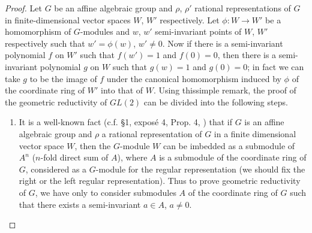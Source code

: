 \begin{proof}
Let $G$ be an affine algebraic group and $\rho$, $\rho'$ rational representations of $G$ in finite-dimensional vector spaces $W$, $W'$ respectively. Let $\phi:W\to W'$ be a homomorphism of $G$-modules and $w$, $w'$ semi-invariant points of $W$, $W'$ respectively such that $w'=\phi(w)$, $w'\neq 0$. Now if there is a semi-invariant polynomial $f$ on $W'$ such that $f(w')=1$ and $f(0)=0$, then there is a semi-invariant polynomial $g$ on $W$ such that $g(w)=1$ and $g(0)=0$; in fact we can take $g$ to be the image of $f$ under the canonical homomorphism induced by $\phi$ of the coordinate ring of $W'$ into that of $W$. Using this\pageoriginale simple remark, the proof of the geometric reductivity of $GL(2)$ can be divided into the following steps.
\begin{enumerate}
\renewcommand{\labelenumi}{(\theenumi)}
\item It is a well-known fact (c.f. \S1, expos\'e 4, Prop. 4, \cite{art18-key2}) that if $G$ is an affine algebraic group and $\rho$ a rational representation of $G$ in a finite dimensional vector space $W$, then the $G$-module $W$ can be imbedded as a submodule of $A^{n}$ ($n$-fold direct sum of $A$), where $A$ is a submodule of the coordinate ring of $G$, considered as a $G$-module for the regular representation (we should fix the right or the left regular representation). Thus to prove geometric reductivity of $G$, we have only to consider submodules $A$ of the coordinate ring of $G$ such that there exists a semi-invariant $a\in A$, $a\neq 0$.


\end{enumerate}
\end{proof}
